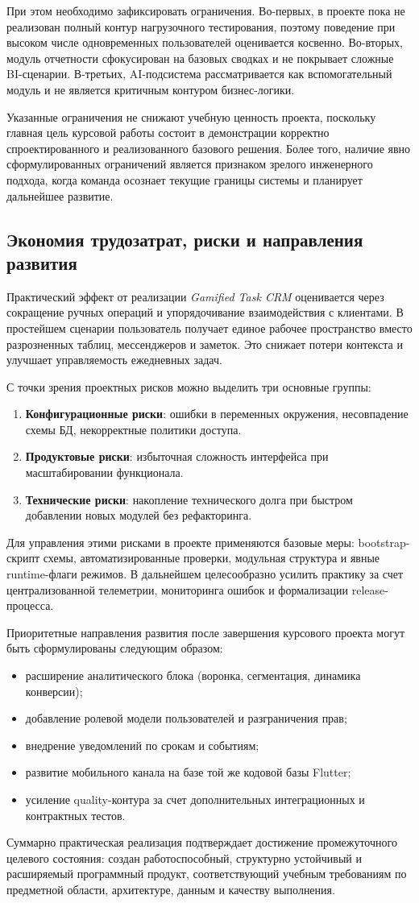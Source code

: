 При этом необходимо зафиксировать ограничения. Во-первых, в проекте пока не реализован полный контур нагрузочного тестирования, поэтому поведение при высоком числе одновременных пользователей оценивается косвенно. Во-вторых, модуль отчетности сфокусирован на базовых сводках и не покрывает сложные BI-сценарии. В-третьих, AI-подсистема рассматривается как вспомогательный модуль и не является критичным контуром бизнес-логики.

Указанные ограничения не снижают учебную ценность проекта, поскольку главная цель курсовой работы состоит в демонстрации корректно спроектированного и реализованного базового решения. Более того, наличие явно сформулированных ограничений является признаком зрелого инженерного подхода, когда команда осознает текущие границы системы и планирует дальнейшее развитие.

\subsection{Экономия трудозатрат, риски и направления развития}

Практический эффект от реализации \textit{Gamified Task CRM} оценивается через сокращение ручных операций и упорядочивание взаимодействия с клиентами. В простейшем сценарии пользователь получает единое рабочее пространство вместо разрозненных таблиц, мессенджеров и заметок. Это снижает потери контекста и улучшает управляемость ежедневных задач.

С точки зрения проектных рисков можно выделить три основные группы:
\begin{enumerate}
  \item \textbf{Конфигурационные риски}: ошибки в переменных окружения, несовпадение схемы БД, некорректные политики доступа.
  \item \textbf{Продуктовые риски}: избыточная сложность интерфейса при масштабировании функционала.
  \item \textbf{Технические риски}: накопление технического долга при быстром добавлении новых модулей без рефакторинга.
\end{enumerate}

Для управления этими рисками в проекте применяются базовые меры: bootstrap-скрипт схемы, автоматизированные проверки, модульная структура и явные runtime-флаги режимов. В дальнейшем целесообразно усилить практику за счет централизованной телеметрии, мониторинга ошибок и формализации release-процесса.

Приоритетные направления развития после завершения курсового проекта могут быть сформулированы следующим образом:
\begin{itemize}
  \item расширение аналитического блока (воронка, сегментация, динамика конверсии);
  \item добавление ролевой модели пользователей и разграничения прав;
  \item внедрение уведомлений по срокам и событиям;
  \item развитие мобильного канала на базе той же кодовой базы Flutter;
  \item усиление quality-контура за счет дополнительных интеграционных и контрактных тестов.
\end{itemize}

Суммарно практическая реализация подтверждает достижение промежуточного целевого состояния: создан работоспособный, структурно устойчивый и расширяемый программный продукт, соответствующий учебным требованиям по предметной области, архитектуре, данным и качеству выполнения.
